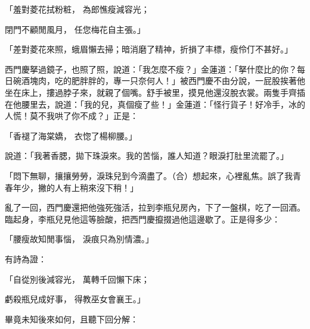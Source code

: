\begin{showcontents}{}
「羞對菱花拭粉粧，  為郎憔瘦減容光；

閉門不顧閒風月，  任您梅花自主張。」

「差對菱花來照，蛾眉懶去掃；暗消磨了精神，折損了丰標，瘦伶仃不甚好。」

西門慶拏過鏡子，也照了照，說道：「我怎麼不瘦？」金蓮道：「拏什麼比的你？每日碗酒塊肉，吃的肥胖胖的，專一只奈何人！」被西門慶不由分說，一屁股挨著他坐在床上，摟過脖子來，就親了個嘴。舒手被里，摸見他還沒脫衣裳。兩隻手齊插在他腰里去，說道：「我的兒，真個瘦了些！」金蓮道：「怪行貨子！好冷手，冰的人慌！莫不我哄了你不成？」正是：

「香褪了海棠嬌，  衣惚了楊柳腰。」

說道：「我著香腮，拋下珠淚來。我的苦惱，誰人知道？眼淚打肚里流罷了。」

「悶下無聊，攘攘勞勞，淚珠兒到今滴盡了。（合）想起來，心裡亂焦。誤了我青春年少，撇的人有上稍來沒下稍！」

亂了一回，西門慶還把他強死強活，拉到李瓶兒房內，下了一盤棋，吃了一回酒。臨起身，李瓶兒見他這等臉酸，把西門慶攛掇過他這邊歇了。正是得多少：

「腰瘦故知閒事惱，  淚痕只為別情濃。」

有詩為證：

「自從別後減容光，  萬轉千回懶下床；

虧殺瓶兒成好事，  得教巫女會襄王。」

畢竟未知後來如何，且聽下回分解：




\end{showcontents}


